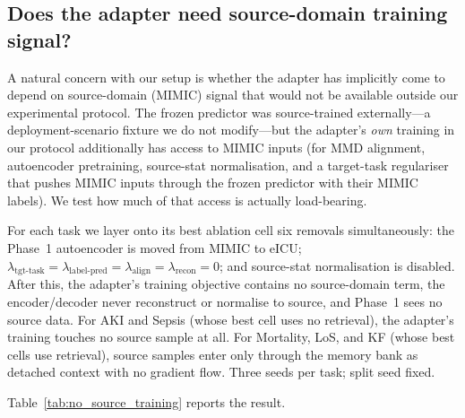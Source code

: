 \subsection{Does the adapter need source-domain training signal?}
\label{sec:no_source_training}

A natural concern with our setup is whether the adapter has implicitly come to depend on source-domain (MIMIC) signal that would not be available outside our experimental protocol. The frozen predictor was source-trained externally---a deployment-scenario fixture we do not modify---but the adapter's \emph{own} training in our protocol additionally has access to MIMIC inputs (for MMD alignment, autoencoder pretraining, source-stat normalisation, and a target-task regulariser that pushes MIMIC inputs through the frozen predictor with their MIMIC labels). We test how much of that access is actually load-bearing.

For each task we layer onto its best ablation cell six removals simultaneously: the Phase~1 autoencoder is moved from MIMIC to eICU; $\lambda_{\text{tgt-task}} = \lambda_{\text{label-pred}} = \lambda_{\text{align}} = \lambda_{\text{recon}} = 0$; and source-stat normalisation is disabled. After this, the adapter's training objective contains no source-domain term, the encoder/decoder never reconstruct or normalise to source, and Phase~1 sees no source data. For AKI and Sepsis (whose best cell uses no retrieval), the adapter's training touches no source sample at all. For Mortality, LoS, and KF (whose best cells use retrieval), source samples enter only through the memory bank as detached context with no gradient flow. Three seeds per task; split seed fixed.

Table~\ref{tab:no_source_training} reports the result.

